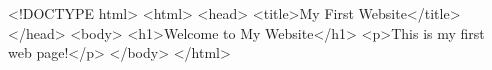 <!DOCTYPE html>
<html>
<head>
    <title>My First Website</title>
</head>
<body>
    <h1>Welcome to My Website</h1>
    <p>This is my first web page!</p>
</body>
</html>